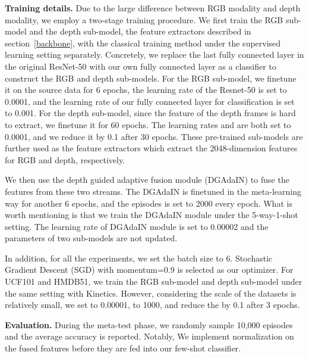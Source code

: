 \documentclass[sigconf]{acmart}
\begin{document}
	
	\noindent\textbf{Training details.} 
	Due to the large difference between RGB modality and depth modality, we employ a two-stage training procedure. We first train the RGB sub-model and the depth sub-model, the feature extractors described in section~\ref{backbone}, with the classical training method under the supervised learning setting separately. Concretely, we replace the last fully connected layer in the original ResNet-50 with our own fully connected layer as a classifier to construct the RGB and depth sub-models. For the RGB sub-model, we finetune it on the source data for 6 epochs, the learning rate of the Resnet-50  is set to 0.0001, and the learning rate of our fully connected layer for classification  is set to 0.001. For the depth sub-model, since the feature of the depth frames is hard to extract, we finetune it for 60 epochs. The learning rates  and  are both set to 0.0001, and we reduce it by 0.1 after 30 epochs. These pre-trained sub-models are further used as the feature extractors which extract the 2048-dimension features for RGB and depth, respectively. 
	
	We then use the depth guided adaptive fusion module (DGAdaIN) to fuse the features from these two streams. The DGAdaIN is finetuned in the meta-learning way for another 6 epochs, and the episodes  is set to 2000 every epoch. What is worth mentioning is that we train the DGAdaIN module under the 5-way-1-shot setting. The learning rate of DGAdaIN module  is set to 0.00002 and the parameters of two sub-models are not updated. 
	
	In addition, for all the experiments, we set the batch size to 6.
	Stochastic Gradient Descent (SGD) with momentum=0.9 is selected as our optimizer. 
	For UCF101 and HMDB51, we train the RGB sub-model and depth sub-model under the same setting with Kinetics. However,  considering the scale of the datasets is relatively small, we set  to 0.00001,  to 1000, and reduce the  by 0.1 after 3 epochs.   
	
	
	
	\noindent\textbf{Evaluation.} During the meta-test phase, we randomly sample 10,000 episodes and the average accuracy is reported. Notably, We implement  normalization on the fused features before they are fed into our few-shot classifier.  
	
	
	
	
	
	
	
\end{document}
